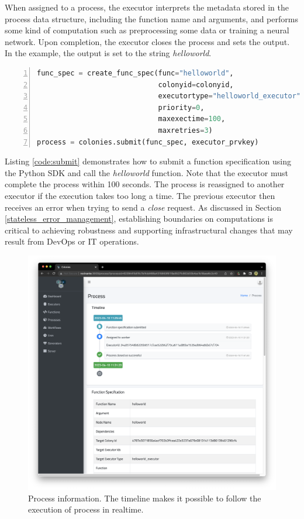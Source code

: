 \documentclass{article}
\begin{document}
When assigned to a process, the executor interprets the metadata stored in the process data structure, including the function name and arguments, and performs some kind of computation such as preprocessing some data or training a neural network. Upon completion, the executor closes the process and sets the output. In the example, the output is set to the string \emph{helloworld}.

\begin{lstlisting}[showstringspaces=false, frame=lines, numbers=left, numberstyle=\scriptsize, backgroundcolor=\color{background}, basicstyle=\small, language=Python, label=code:submit, caption=Submitting a function specification.]
func_spec = create_func_spec(func="helloworld",
                             colonyid=colonyid,
                             executortype="helloworld_executor",
                             priority=0,
                             maxexectime=100,
                             maxretries=3)
process = colonies.submit(func_spec, executor_prvkey)
\end{lstlisting}

Listing \ref{code:submit} demonstrates how to submit a function specification using the Python SDK and call the \emph{helloworld} function. Note that the executor must complete the process within 100 seconds. The process is reassigned to another executor if the execution takes too long a time. The previous executor then receives an error when trying to send a \emph{close} request. As discussed in Section \ref{stateless_error_management}, establishing boundaries on computations is critical to achieving robustness and supporting infrastructural changes that may result from DevOps or IT operations.

\begin{figure}[h]
	\centering
    \includegraphics[scale=0.23]{dashboard1.png}
	\caption{Process information. The timeline makes it possible to follow the execution of process in realtime.}
	\label{fig:dashboard1}
\end{figure}
\end{document}
